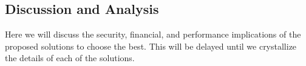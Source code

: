 \subsection{Discussion and Analysis}
\label{analysis}
Here we will discuss the security, financial, and performance implications of the 
proposed solutions to choose the best. This will be delayed until we crystallize the 
details of each of the solutions.
